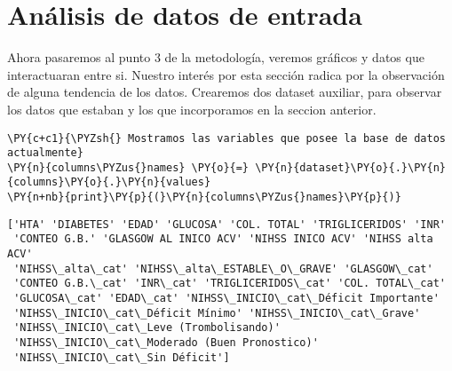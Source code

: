     \hypertarget{anuxe1lisis-de-datos-de-entrada}{%
\section{Análisis de datos de
entrada}\label{anuxe1lisis-de-datos-de-entrada}}

Ahora pasaremos al punto 3 de la metodología, veremos gráficos y datos
que interactuaran entre si. Nuestro interés por esta sección radica por
la observación de alguna tendencia de los datos. Crearemos dos dataset
auxiliar, para observar los datos que estaban y los que incorporamos en
la seccion anterior.

    \begin{tcolorbox}[breakable, size=fbox, boxrule=1pt, pad at break*=1mm,colback=cellbackground, colframe=cellborder]
\begin{Verbatim}[commandchars=\\\{\}]
\PY{c+c1}{\PYZsh{} Mostramos las variables que posee la base de datos actualmente}
\PY{n}{columns\PYZus{}names} \PY{o}{=} \PY{n}{dataset}\PY{o}{.}\PY{n}{columns}\PY{o}{.}\PY{n}{values}
\PY{n+nb}{print}\PY{p}{(}\PY{n}{columns\PYZus{}names}\PY{p}{)}
\end{Verbatim}
\end{tcolorbox}

    \begin{Verbatim}[commandchars=\\\{\}]
['HTA' 'DIABETES' 'EDAD' 'GLUCOSA' 'COL. TOTAL' 'TRIGLICERIDOS' 'INR'
 'CONTEO G.B.' 'GLASGOW AL INICO ACV' 'NIHSS INICO ACV' 'NIHSS alta ACV'
 'NIHSS\_alta\_cat' 'NIHSS\_alta\_ESTABLE\_O\_GRAVE' 'GLASGOW\_cat'
 'CONTEO G.B.\_cat' 'INR\_cat' 'TRIGLICERIDOS\_cat' 'COL. TOTAL\_cat'
 'GLUCOSA\_cat' 'EDAD\_cat' 'NIHSS\_INICIO\_cat\_Déficit Importante'
 'NIHSS\_INICIO\_cat\_Déficit Mínimo' 'NIHSS\_INICIO\_cat\_Grave'
 'NIHSS\_INICIO\_cat\_Leve (Trombolisando)'
 'NIHSS\_INICIO\_cat\_Moderado (Buen Pronostico)'
 'NIHSS\_INICIO\_cat\_Sin Déficit']
    \end{Verbatim}

